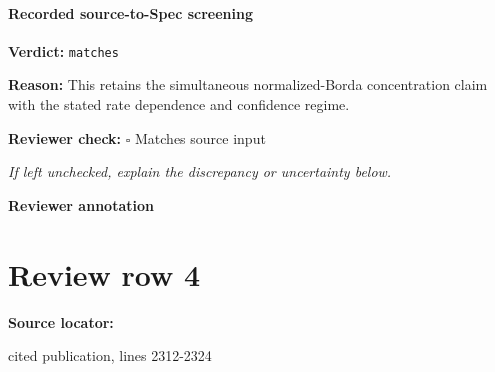 \documentclass[10pt]{article}
\newcommand{\reviewerbox}{%
  \par\noindent\fbox{\parbox{0.96\linewidth}{\rule{0pt}{0.38in}}}\par
}
\newcommand{\reviewmatch}[1]{%
  \par\noindent\textbf{Reviewer check:} $\square$\; #1\par
  \noindent\emph{If left unchecked, explain the discrepancy or uncertainty below.}\par
}
\begin{document}
\paragraph{Recorded source-to-Spec screening}
\textbf{Verdict:} \texttt{matches}
\\
{\raggedright
\textbf{Reason:} This retains the simultaneous normalized-\allowbreak{}Borda concentration claim with the stated rate dependence and confidence regime.\allowbreak{}
\par}
\reviewmatch{Matches source input}
\noindent\textbf{Reviewer annotation}\par
\reviewerbox
\clearpage
\hypertarget{source-claim-99f78f35feb19dfc}{}
\section*{Review row 4}
\textbf{Source locator:} {\footnotesize\raggedright cited publication, lines 2312-\allowbreak{}2324\par}
\end{document}
